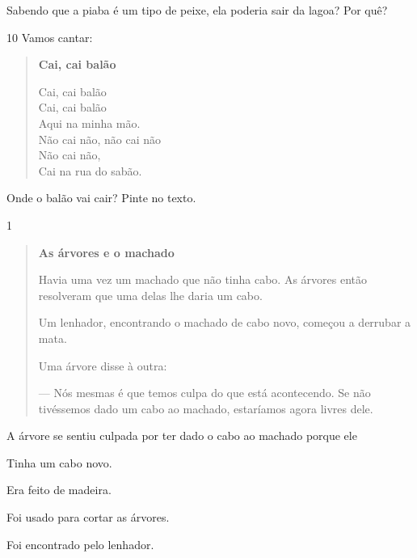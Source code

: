 
Sabendo que a piaba é um tipo de peixe, ela poderia sair da lagoa? Por quê?


\num{10} Vamos cantar:

\begin{verse}
\textbf{Cai, cai balão}

Cai, cai balão\\
Cai, cai balão\\
Aqui na minha mão.\\
Não cai não, não cai não\\
Não cai não,\\
Cai na rua do sabão.
\end{verse}


Onde o balão vai cair? Pinte no texto.


\num{1}

\begin{quote}
\textbf{As árvores e o machado}

Havia uma vez um machado que não tinha cabo.
As árvores então resolveram que uma delas lhe daria
um cabo.

Um lenhador, encontrando o machado de cabo novo,
começou a derrubar a mata.

Uma árvore disse à outra:

--- Nós mesmas é que temos culpa do que está
acontecendo. Se não tivéssemos dado um cabo ao machado,
estaríamos agora livres dele.
\end{quote}


A árvore se sentiu culpada por ter dado o cabo ao machado porque ele

\begin{escolha}
\item Tinha um cabo novo.

\item Era feito de madeira.

\item Foi usado para cortar as árvores.

\item Foi encontrado pelo lenhador.
\end{escolha}

